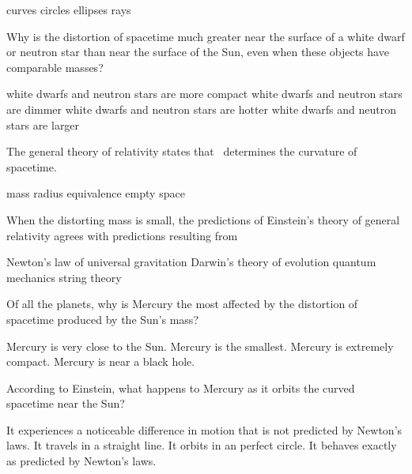 \documentclass{exam}
\begin{document}
\begin{questions}
\begin{randomizechoices}
\correctchoice curves
\choice circles
\choice ellipses
\choice rays
\end{randomizechoices}

\question
Why is the distortion of spacetime much greater near the surface of a white dwarf or neutron star than near the surface of the Sun, even when these objects have comparable masses?

\begin{randomizechoices}
\correctchoice white dwarfs and neutron stars are more compact
\choice white dwarfs and neutron stars are dimmer
\choice white dwarfs and neutron stars are hotter
\choice white dwarfs and neutron stars are larger
\end{randomizechoices}

\question
The general theory of relativity states that \fillin\ determines the curvature of spacetime.

\begin{randomizechoices}
\correctchoice mass
\choice radius
\choice equivalence
\choice empty space
\end{randomizechoices}

\question
When the distorting mass is small, the predictions of Einstein's theory of general relativity agrees with predictions resulting from

\begin{randomizechoices}
\correctchoice Newton's law of universal gravitation 
\choice Darwin's theory of evolution
\choice quantum mechanics
\choice string theory
\end{randomizechoices}

\question
Of all the planets, why is Mercury the most affected by the distortion of spacetime produced by the Sun's mass?

\begin{randomizechoices}
\correctchoice Mercury is very close to the Sun.
\choice Mercury is the smallest.
\choice Mercury is extremely compact.
\choice Mercury is near a black hole.
\end{randomizechoices}

\question
According to Einstein, what happens to Mercury as it orbits the curved spacetime near the Sun?

\begin{randomizechoices}
\correctchoice It experiences a noticeable difference in motion that is not predicted by Newton's laws.
\choice It travels in a straight line.
\choice It orbits in an perfect circle.
\choice It behaves exactly as predicted by Newton's laws.
\end{randomizechoices}


\end{questions}
\end{document}
